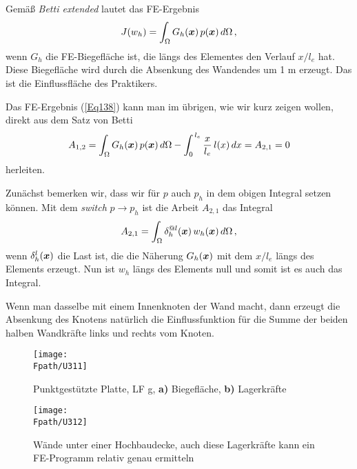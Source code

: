 {{{{Gem\"{a}{\ss} {\em Betti extended\/} lautet das FE-Ergebnis
\begin{align}\label{Eq138}
J(w_h)= \int_{\Omega} G_h(\mbox{\boldmath $x$})\,p(\mbox{\boldmath $x$})\,d\Omega\,,
\end{align}
wenn $G_h$ die FE-Biegefl\"{a}che ist, die l\"{a}ngs des Elementes den Verlauf $x/l_e $ hat.  Diese Biegefl\"{a}che wird durch die Absenkung des Wandendes um 1 m erzeugt. Das ist die Einflussfl\"{a}che des Praktikers.

Das FE-Ergebnis (\ref{Eq138}) kann man im \"{u}brigen, wie wir kurz zeigen wollen, direkt aus dem Satz von Betti
\begin{align}
A_{1,2} = \int_{\Omega} G_h(\mbox{\boldmath $x$})\,p(\mbox{\boldmath $x$})\,d\Omega - \int_0^{\,l_e} \frac{x}{l_e}\,l(x)\,dx = A_{2,1}  = 0
\end{align}
herleiten.

Zun\"{a}chst bemerken wir, dass wir f\"{u}r $p$ auch $p_h$ in dem obigen Integral setzen k\"{o}nnen. Mit dem {\em switch\/} $p \to p_h$ ist die Arbeit $A_{2,1}$ das Integral
\begin{align}
A_{2,1} = \int_{\Omega} \delta_h^{@l}(\mbox{\boldmath $x$})\,w_h(\mbox{\boldmath $x$})\,d\Omega\,,
\end{align}
wenn $\delta_h^l(\mbox{\boldmath $x$})$ die Last ist, die die N\"{a}herung $G_h(\mbox{\boldmath $x$})$ mit dem $x/l_e$ l\"{a}ngs des Elements erzeugt. Nun ist $w_h$ l\"{a}ngs des Elements null und somit ist es auch das Integral.

Wenn man dasselbe mit einem Innenknoten der Wand macht, dann erzeugt die Absenkung des Knotens nat\"{u}rlich die Einflussfunktion f\"{u}r die Summe der beiden \glq halben\grq{} Wandkr\"{a}fte links und rechts vom Knoten.

\begin{figure}[tbp]
\centering
\texttt{[image: \\Fpath/U311]}
\caption{Punktgest\"{u}tzte Platte, LF g, \textbf{ a)} Biegefl\"{a}che, \textbf{ b)} Lagerkr\"{a}fte} \label{U311}
\end{figure}%
\begin{figure}[tbp]
\centering
\texttt{[image: \\Fpath/U312]}
\caption{W\"{a}nde unter einer Hochbaudecke, auch diese Lagerkr\"{a}fte kann ein FE-Programm relativ genau ermitteln} \label{U312} %
\end{figure}%

}}}}
